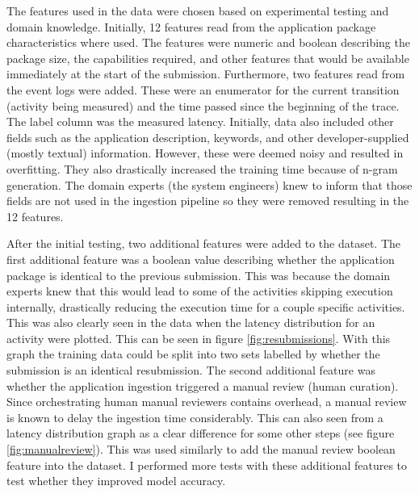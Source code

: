 The features used in the data were chosen based on experimental testing and domain knowledge.
Initially, 12 features read from the application package characteristics where used. The features were numeric and boolean describing the package size, the capabilities required, and other features that would be available immediately at the start of the submission.
Furthermore, two features read from the event logs were added.
These were an enumerator for the current transition (activity being measured) and the time passed since the beginning of the trace.
The label column was the measured latency.
Initially, data also included other fields such as the application description, keywords, and other developer-supplied (mostly textual) information. 
However, these were deemed noisy and resulted in overfitting.
They also drastically increased the training time because of n-gram generation.
The domain experts (the system engineers) knew to inform that those fields are not used in the ingestion pipeline so they were removed resulting in the 12 features.

After the initial testing, two additional features were added to the dataset.
The first additional feature was a boolean value describing whether the application package is identical to the previous submission.
This was because the domain experts knew that this would lead to some of the activities skipping execution internally, drastically reducing the execution time for a couple specific activities. 
This was also clearly seen in the data when the latency distribution for an activity were plotted. 
This can be seen in figure \ref{fig:resubmissions}. 
With this graph the training data could be split into two sets labelled by whether the submission is an identical resubmission.
The second additional feature was whether the application ingestion triggered a manual review (human curation). 
Since orchestrating human manual reviewers contains overhead, a manual review is known to delay the ingestion time considerably.
This can also seen from a latency distribution graph as a clear difference for some other steps (see figure \ref{fig:manualreview}).
This was used similarly to add the manual review boolean feature into the dataset.
I performed more tests with these additional features to test whether they improved model accuracy.

